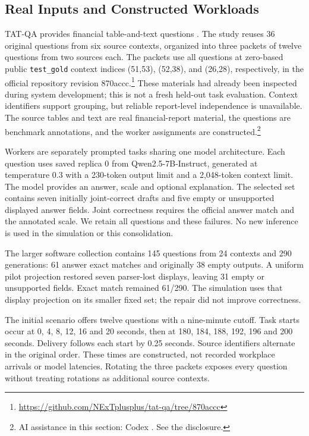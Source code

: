\documentclass[a4paper,twoside]{article}
\newcommand{\aicredit}{\footnote{AI assistance in this section: Codex \cite{codex}. See the disclosure.}}
\begin{document}
\subsection{Real Inputs and Constructed Workloads}
TAT-QA provides financial table-and-text questions \cite{tatqa}. The study reuses 36 original questions from six source contexts, organized into three packets of twelve questions from two sources each. The packets use all questions at zero-based public \texttt{test\_gold} context indices (51,53), (52,38), and (26,28), respectively, in the official repository revision 870accc.\footnote{\url{https://github.com/NExTplusplus/tat-qa/tree/870accc}} These materials had already been inspected during system development; this is not a fresh held-out task evaluation. Context identifiers support grouping, but reliable report-level independence is unavailable. The source tables and text are real financial-report material, the questions are benchmark annotations, and the worker assignments are constructed.\aicredit

Workers are separately prompted tasks sharing one model architecture. Each question uses saved replica 0 from Qwen2.5-7B-Instruct, generated at temperature 0.3 with a 230-token output limit and a 2,048-token context limit. The model provides an answer, scale and optional explanation. The selected set contains seven initially joint-correct drafts and five empty or unsupported displayed answer fields. Joint correctness requires the official answer match and the annotated scale. We retain all questions and these failures. No new inference is used in the simulation or this consolidation.

The larger software collection contains 145 questions from 24 contexts and 290 generations: 61 answer exact matches and originally 38 empty outputs. A uniform pilot projection restored seven parser-lost displays, leaving 31 empty or unsupported fields. Exact match remained 61/290. The simulation uses that display projection on its smaller fixed set; the repair did not improve correctness.

The initial scenario offers twelve questions with a nine-minute cutoff. Task starts occur at 0, 4, 8, 12, 16 and 20 seconds, then at 180, 184, 188, 192, 196 and 200 seconds. Delivery follows each start by 0.25 seconds. Source identifiers alternate in the original order. These times are constructed, not recorded workplace arrivals or model latencies. Rotating the three packets exposes every question without treating rotations as additional source contexts.
\end{document}
